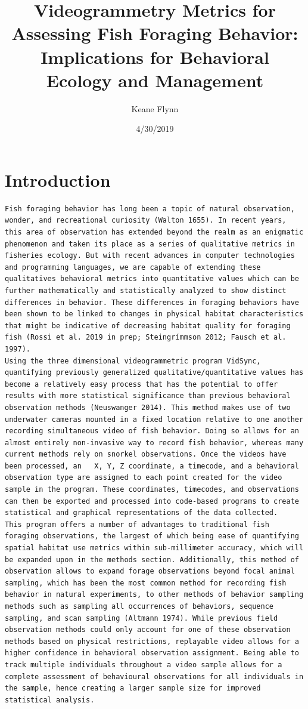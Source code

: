 \documentclass[]{article}
\title{Videogrammetry Metrics for Assessing Fish Foraging Behavior:
Implications for Behavioral Ecology and Management}
\author{Keane Flynn}
\date{4/30/2019}
\begin{document}
\maketitle

\section{\texorpdfstring{\textbf{Introduction}}{Introduction}}\label{introduction}

\begin{verbatim}
Fish foraging behavior has long been a topic of natural observation, wonder, and recreational curiosity (Walton 1655). In recent years, this area of observation has extended beyond the realm as an enigmatic phenomenon and taken its place as a series of qualitative metrics in fisheries ecology. But with recent advances in computer technologies and programming languages, we are capable of extending these qualitatives behavioral metrics into quantitative values which can be further mathematically and statistically analyzed to show distinct differences in behavior. These differences in foraging behaviors have been shown to be linked to changes in physical habitat characteristics that might be indicative of decreasing habitat quality for foraging fish (Rossi et al. 2019 in prep; Steingrímmson 2012; Fausch et al. 1997). 
Using the three dimensional videogrammetric program VidSync, quantifying previously generalized qualitative/quantitative values has become a relatively easy process that has the potential to offer results with more statistical significance than previous behavioral observation methods (Neuswanger 2014). This method makes use of two underwater cameras mounted in a fixed location relative to one another recording simultaneous video of fish behavior. Doing so allows for an almost entirely non-invasive way to record fish behavior, whereas many current methods rely on snorkel observations. Once the videos have been processed, an   X, Y, Z coordinate, a timecode, and a behavioral observation type are assigned to each point created for the video sample in the program. These coordinates, timecodes, and observations can then be exported and processed into code-based programs to create statistical and graphical representations of the data collected.
This program offers a number of advantages to traditional fish foraging observations, the largest of which being ease of quantifying spatial habitat use metrics within sub-millimeter accuracy, which will be expanded upon in the methods section. Additionally, this method of observation allows to expand forage observations beyond focal animal sampling, which has been the most common method for recording fish behavior in natural experiments, to other methods of behavior sampling methods such as sampling all occurrences of behaviors, sequence sampling, and scan sampling (Altmann 1974). While previous field observation methods could only account for one of these observation methods based on physical restrictions, replayable video allows for a higher confidence in behavioral observation assignment. Being able to track multiple individuals throughout a video sample allows for a complete assessment of behavioural observations for all individuals in the sample, hence creating a larger sample size for improved statistical analysis.

\end{verbatim}
\end{document}
